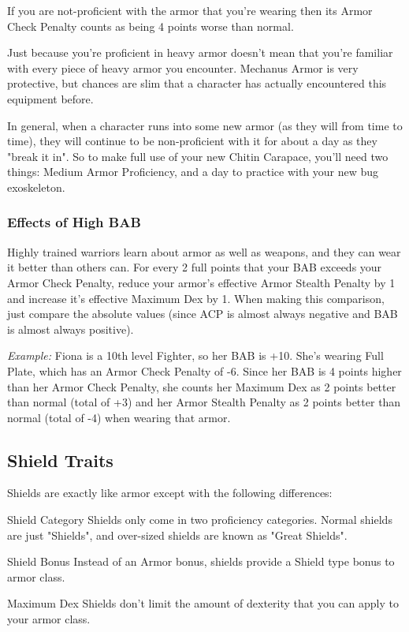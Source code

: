 If you are not-proficient with the armor that you're wearing then its Armor Check Penalty counts as being 4 points worse than normal.

Just because you're proficient in heavy armor doesn't mean that you're familiar with every piece of heavy armor you encounter. Mechanus Armor is very protective, but chances are slim that a character has actually encountered this equipment before.

In general, when a character runs into some new armor (as they will from time to time), they will continue to be non-proficient with it for about a day as they "break it in". So to make full use of your new Chitin Carapace, you'll need two things: Medium Armor Proficiency, and a day to practice with your new bug exoskeleton.

\subsubsection{Effects of High BAB}

Highly trained warriors learn about armor as well as weapons, and they can wear it better than others can. For every 2 full points that your BAB exceeds your Armor Check Penalty, reduce your armor's effective Armor Stealth Penalty by 1 and increase it's effective Maximum Dex by 1. When making this comparison, just compare the absolute values (since ACP is almost always negative and BAB is almost always positive).

\textit{Example:} Fiona is a 10th level Fighter, so her BAB is +10. She's wearing Full Plate, which has an Armor Check Penalty of -6. Since her BAB is 4 points higher than her Armor Check Penalty, she counts her Maximum Dex as 2 points better than normal (total of +3) and her Armor Stealth Penalty as 2 points better than normal (total of -4) when wearing that armor.

\subsection{Shield Traits}

Shields are exactly like armor except with the following differences:

\begin{description*}
\item[Shield Category] Shields only come in two proficiency categories. Normal shields are just "Shields", and over-sized shields are known as "Great Shields".

\item[Shield Bonus] Instead of an Armor bonus, shields provide a Shield type bonus to armor class.

\item[Maximum Dex] Shields don't limit the amount of dexterity that you can apply to your armor class.
\end{description*}

